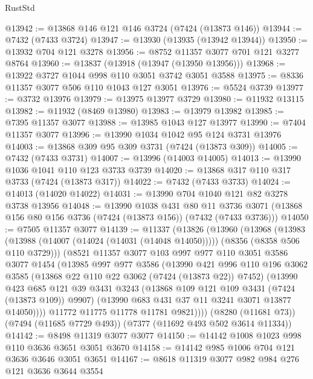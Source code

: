 \begin{lexlean}{RustStd}
\begin{coremodule}
{\begin{coremodule}
{{{{{{{{{{{{{{{{{{{{{{{{{{{{{{{{@13942 := @13868 @146 @121 @146 @3724 (@7424 (@13873 @146))
@13944 := @7432 (@7433 @3724)
@13947 := @13930 (@13935 (@13942 @13944))
@13950 := @13932 @704 @121 @3278
@13956 := @8752 @11357 @3077 @701 @121 @3277 @8764
@13960 := @13837 (@13918 (@13947 (@13950 @13956)))
@13968 := @13922 @3727 @1044 @998 @110 @3051 @3742 @3051 @3588
@13975 := @8336 @11357 @3077 @506 @110 @1043 @127 @3051
@13976 := @5524 @3739
@13977 := @3732 @13976
@13979 := @13975 @13977 @3729
@13980 := @11932 @13115
@13982 := @11932 (@8469 @13980)
@13983 := @13979 @13982
@13985 := @7395 @11357 @3077
@13988 := @13985 @1043 @127 @13977
@13990 := @7404 @11357 @3077
@13996 := @13990 @1034 @1042 @95 @124 @3731 @13976
@14003 := @13868 @309 @95 @309 @3731 (@7424 (@13873 @309))
@14005 := @7432 (@7433 @3731)
@14007 := @13996 (@14003 @14005)
@14013 := @13990 @1036 @1041 @110 @123 @3733 @3739
@14020 := @13868 @317 @110 @317 @3733 (@7424 (@13873 @317))
@14022 := @7432 (@7433 @3733)
@14024 := @14013 (@14020 @14022)
@14031 := @13990 @704 @1040 @121 @82 @3278 @3738 @13956
@14048 := @13990
    @1038
    @431
    @80
    @11
    @3736
    @3071
    (@13868 @156 @80 @156 @3736 (@7424 (@13873 @156)) (@7432 (@7433 @3736)))
@14050 := @7505 @11357 @3077
@14139 := @11337
    (@13826
      (@13960
        (@13968
          (@13983
            (@13988 (@14007 (@14024 (@14031 (@14048 @14050)))))
            (@8356 (@8358 @506 @110 @3729)))
          (@8521
            @11357
            @3077
            @103
            @997
            @977
            @110
            @3051
            @3586
            @3077
            @1454
            (@13985
              @997
              @977
              @3586
              (@13990
                @421
                @996
                @110
                @196
                @3062
                @3585
                (@13868 @22 @110 @22 @3062 (@7424 (@13873 @22)) @7452)
                (@13990
                  @423
                  @685
                  @121
                  @39
                  @3431
                  @3243
                  (@13868 @109 @121 @109 @3431 (@7424 (@13873 @109)) @9907)
                  (@13990 @683 @431 @37 @11 @3241 @3071 @13877 @14050))))
            @11772
            @11775
            @11778
            @11781
            @9821))))
    (@8280 (@11681 @73))
    (@7494 (@11685 @7729 @493))
    (@7377 (@11692 @493 @502 @3614 @11334))
@14142 := @8498 @11319 @3077 @3077
@14150 := @14142 @1008 @1023 @998 @110 @3636 @3651 @3051 @3670
@14158 := @14142 @985 @1006 @704 @121 @3636 @3646 @3051 @3651
@14167 := @8618 @11319 @3077 @982 @984 @276 @121 @3636 @3644 @3554
}}}}}}}}}}}}}}}}}}}}}}}}}}}}}}}}
\end{coremodule}}
\end{coremodule}
\end{lexlean}
